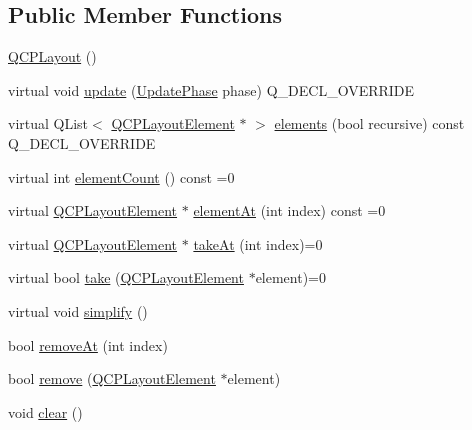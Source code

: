 \subsection*{Public Member Functions}
\begin{DoxyCompactItemize}
\item 
\mbox{\hyperlink{class_q_c_p_layout_a04222e6e1361fd802d48f1a25b7020d4}{Q\+C\+P\+Layout}} ()
\item 
virtual void \mbox{\hyperlink{class_q_c_p_layout_a48ecc9c98ea90b547c3e27a931a8f7bd}{update}} (\mbox{\hyperlink{class_q_c_p_layout_element_a0d83360e05735735aaf6d7983c56374d}{Update\+Phase}} phase) Q\+\_\+\+D\+E\+C\+L\+\_\+\+O\+V\+E\+R\+R\+I\+DE
\item 
virtual Q\+List$<$ \mbox{\hyperlink{class_q_c_p_layout_element}{Q\+C\+P\+Layout\+Element}} $\ast$ $>$ \mbox{\hyperlink{class_q_c_p_layout_aca129722c019f91d3367046f80abfa77}{elements}} (bool recursive) const Q\+\_\+\+D\+E\+C\+L\+\_\+\+O\+V\+E\+R\+R\+I\+DE
\item 
virtual int \mbox{\hyperlink{class_q_c_p_layout_a39d3e9ef5d9b82ab1885ba1cb9597e56}{element\+Count}} () const =0
\item 
virtual \mbox{\hyperlink{class_q_c_p_layout_element}{Q\+C\+P\+Layout\+Element}} $\ast$ \mbox{\hyperlink{class_q_c_p_layout_afa73ca7d859f8a3ee5c73c9b353d2a56}{element\+At}} (int index) const =0
\item 
virtual \mbox{\hyperlink{class_q_c_p_layout_element}{Q\+C\+P\+Layout\+Element}} $\ast$ \mbox{\hyperlink{class_q_c_p_layout_a5a79621fa0a6eabb8b520cfc04fb601a}{take\+At}} (int index)=0
\item 
virtual bool \mbox{\hyperlink{class_q_c_p_layout_ada26cd17e56472b0b4d7fbbc96873e4c}{take}} (\mbox{\hyperlink{class_q_c_p_layout_element}{Q\+C\+P\+Layout\+Element}} $\ast$element)=0
\item 
virtual void \mbox{\hyperlink{class_q_c_p_layout_a41e6ac049143866e8f8b4964efab01b2}{simplify}} ()
\item 
bool \mbox{\hyperlink{class_q_c_p_layout_a2403f684fee3ce47132faaeed00bb066}{remove\+At}} (int index)
\item 
bool \mbox{\hyperlink{class_q_c_p_layout_a6c58f537d8086f352576ab7c5b15d0bc}{remove}} (\mbox{\hyperlink{class_q_c_p_layout_element}{Q\+C\+P\+Layout\+Element}} $\ast$element)
\item 
void \mbox{\hyperlink{class_q_c_p_layout_a02883bdf2769b5b227f0232dba1ac4ee}{clear}} ()
\end{DoxyCompactItemize}
